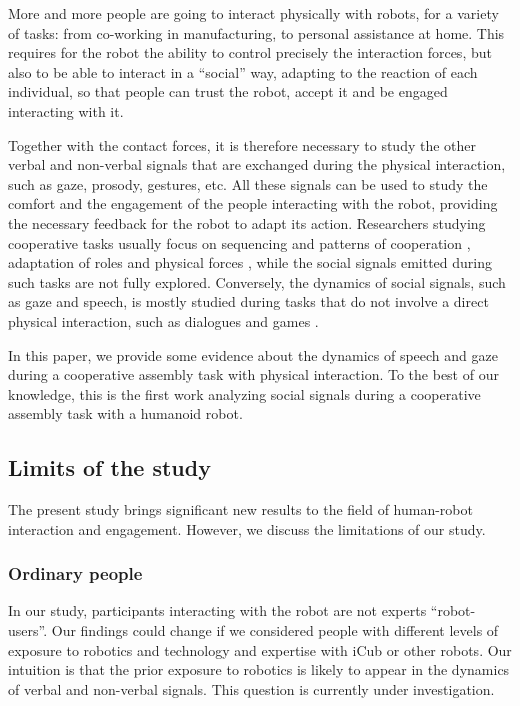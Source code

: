 More and more people are going to interact physically with robots, for a variety of tasks: from co-working in manufacturing, to personal assistance at home.
This requires for the robot the ability to control precisely the interaction forces, but also to be able to interact in a ``social'' way, adapting to the reaction of each individual, so that people can trust the robot, accept it and be engaged interacting with it. 


Together with the contact forces, it is therefore necessary to study the other verbal and non-verbal signals that are exchanged during the physical interaction, such as gaze, prosody, gestures, etc.
All these signals can be used to study the comfort and the engagement of the people interacting with the robot, providing the necessary feedback for the robot to adapt its action.
Researchers studying cooperative tasks usually focus on sequencing and patterns of cooperation \cite{Wilcox2012}, adaptation of roles and physical forces \cite{Stefanov2009}, while the social signals emitted during such tasks are not fully explored.
Conversely, the dynamics of social signals, such as gaze and speech, is mostly studied during tasks that do not involve a direct physical interaction, such as dialogues and games \cite{Boucenna2014,Anzalone2015engagement,Castellano2009}.

In this paper, we provide some evidence about the dynamics of speech and gaze during a cooperative assembly task with physical interaction. To the best of our knowledge, this is the first work analyzing social signals during a cooperative assembly task with a humanoid robot.






\subsection{Limits of the study}

The present study brings significant new results to the field of human-robot interaction and engagement. However, we discuss the limitations of our study.

\subsubsection{Ordinary people}

In our study, participants interacting with the robot are not experts ``robot-users''. Our findings could change if we considered people with different levels of exposure to robotics and technology and expertise with iCub or other robots. 
Our intuition is that the prior exposure to robotics is likely to appear in the dynamics of verbal and non-verbal signals.
This question is currently under investigation.

